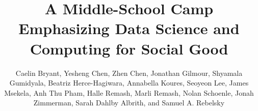 \documentclass[sigconf]{acmart}
\begin{document}
\title[A Middle School Camp: Data Science \& Computing for Social Good]{A Middle-School Camp Emphasizing Data Science and Computing for Social Good}

\author{Caelin Bryant, Yesheng Chen, Zhen Chen, Jonathan Gilmour, Shyamala Gumidyala, Beatriz Herce-Hagiwara, Annabella Koures, Seoyeon Lee, James Msekela, Anh Thu Pham, Halle Remash, Marli Remash, Nolan Schoenle, Jonah Zimmerman, Sarah Dahlby Albrith, and Samuel A. Rebelsky}

\renewcommand{\shortauthors}{Bryant \textit{et al.}}





\maketitle






\balance
 
\end{document}
